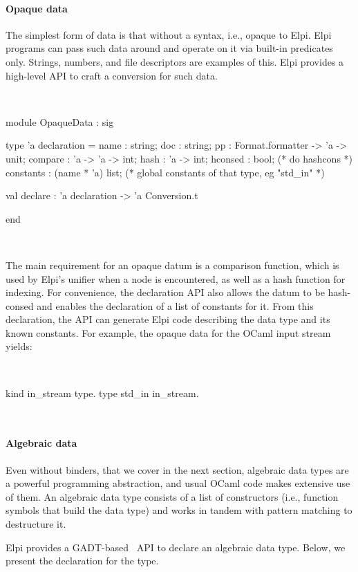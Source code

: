 \documentclass[a4paper, 11pt]{book}
\newenvironment{elpicode}
  {\VerbatimEnvironment~\\\begin{elpibox}\begin{xelpicode}}{\end{xelpicode}
\end{elpibox}\\}
\newenvironment{ocamlcode}
  {\VerbatimEnvironment~\\\begin{ocamlbox}\begin{xocamlcode}}{\end{xocamlcode}
\end{ocamlbox}\\}
\begin{document}
\paragraph{Opaque data}

The simplest form of data is that without a syntax, i.e., opaque to Elpi. Elpi
programs can pass such data around and operate on it via built-in predicates
only. Strings, numbers, and file descriptors are examples of this. Elpi
provides a high-level API to craft a conversion for such data.

\begin{ocamlcode}
module OpaqueData : sig

  type 'a declaration = {
    name : string;
    doc : string;
    pp : Format.formatter -> 'a -> unit;
    compare : 'a -> 'a -> int;
    hash : 'a -> int;
    hconsed : bool;               (* do hashcons *)
    constants : (name * 'a) list; (* global constants of that type,
                                     eg "std_in" *)
  }

  val declare : 'a declaration -> 'a Conversion.t

end
\end{ocamlcode}

\noindent
The main requirement for an opaque datum is a comparison function, which is
used by Elpi's unifier when a  node is encountered, as well as a
hash function for indexing. For convenience, the declaration API also allows
the datum to be hash-consed and enables the declaration of a list of constants
for it. From this declaration, the API can generate Elpi code describing the
data type and its known constants. For example, the opaque data for the OCaml
input stream yields:

\begin{elpicode}
kind in_stream type.
type std_in in_stream.
\end{elpicode}

\paragraph{Algebraic data}

Even without binders, that we cover in the next section,
algebraic data types are a powerful programming
abstraction, and usual OCaml code makes extensive use of them. An algebraic
data type consists of a list of constructors (i.e., function symbols that build
the data type) and works in tandem with pattern matching to destructure it.

Elpi provides a GADT-based~\cite{SHEARD200849} API to declare an algebraic
data type. Below, we present the declaration for the  type.
\end{document}
